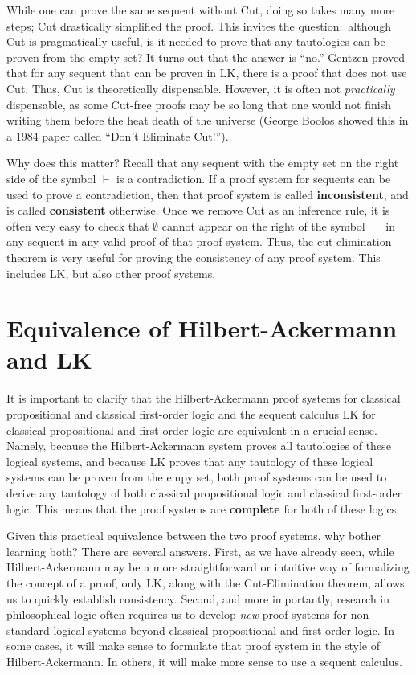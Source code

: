 \documentclass[11pt]{article}
\theoremstyle{definition}
\theoremstyle{remark}
\begin{document}
\noindent
While one can prove the same sequent without Cut, doing so takes many more steps; Cut drastically simplified the proof. This invites the question:\ although Cut is pragmatically useful, is it needed to prove that any tautologies can be proven from the empty set? It turns out that the answer is ``no.'' Gentzen proved that for any sequent that can be proven in LK, there is a proof that does not use Cut. Thus, Cut is theoretically dispensable. However, it is often not \textit{practically} dispensable, as some Cut-free proofs may be so long that one would not finish writing them before the heat death of the universe (George Boolos showed this in a 1984 paper called ``Don't Eliminate Cut!'').  \par 


Why does this matter? Recall that any sequent with the empty set on the right side of the symbol $\vdash$ is a contradiction. If a proof system for sequents can be used to prove a contradiction, then that proof system is called \textbf{inconsistent}, and is called \textbf{consistent} otherwise. Once we remove Cut as an inference rule, it is often very easy to check that $\emptyset$ cannot appear on the right of the symbol $\vdash$ in any sequent in any valid proof of that proof system. Thus, the cut-elimination theorem is very useful for proving the consistency of any proof system. This includes LK, but also other proof systems.\par 

\section{Equivalence of Hilbert-Ackermann and LK}
It is important to clarify that the Hilbert-Ackermann proof systems for classical propositional and classical first-order logic and the sequent calculus LK for classical propositional and first-order logic are equivalent in a crucial sense. Namely, because the Hilbert-Ackermann system proves all tautologies of these logical systems, and because LK proves that any tautology of these logical systems can be proven from the empy set, both proof systems can be used to derive any tautology of both classical propositional logic and classical first-order logic. This means that the proof systems are \textbf{complete} for both of these logics.\par

Given this practical equivalence between the two proof systems, why bother learning both? There are several answers. First, as we have already seen, while Hilbert-Ackermann may be a more straightforward or intuitive way of formalizing the concept of a proof, only LK, along with the Cut-Elimination theorem, allows us to quickly establish consistency. Second, and more importantly, research in philosophical logic often requires us to develop \textit{new} proof systems for non-standard logical systems beyond classical propositional and first-order logic. In some cases, it will make sense to formulate that proof system in the style of Hilbert-Ackermann. In others, it will make more sense to use a sequent calculus.\par 
\end{document}
